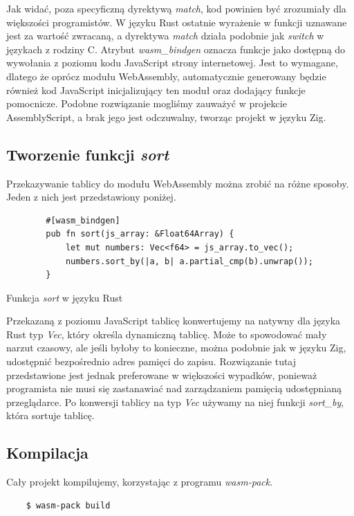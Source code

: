 \documentclass[language=polish,type=master]{aghmodern}
\begin{document}
Jak widać, poza specyficzną dyrektywą \emph{match}, kod powinien być zrozumiały dla większości programistów.
W języku Rust ostatnie wyrażenie w funkcji uznawane jest za wartość zwracaną, a dyrektywa \emph{match} działa podobnie jak \emph{switch} w językach z rodziny C.
Atrybut \emph{wasm\_bindgen} oznacza funkcje jako dostępną do wywołania z poziomu kodu JavaScript strony internetowej.
Jest to wymagane, dlatego że oprócz modułu WebAssembly, automatycznie generowany będzie również kod JavaScript inicjalizujący ten moduł oraz dodający funkcje pomocnicze.
Podobne rozwiązanie mogliśmy zauważyć w projekcie AssemblyScript, a brak jego jest odczuwalny, tworząc projekt w języku Zig.

\clearpage

\subsection{Tworzenie funkcji \emph{sort}}
Przekazywanie tablicy do modułu WebAssembly można zrobić na różne sposoby.
Jeden z nich jest przedstawiony poniżej.

\begin{listing}[H]
    \begin{verbatim}
        #[wasm_bindgen]
        pub fn sort(js_array: &Float64Array) {
            let mut numbers: Vec<f64> = js_array.to_vec();
            numbers.sort_by(|a, b| a.partial_cmp(b).unwrap());
        }
    \end{verbatim}
    \caption{Funkcja \emph{sort} w języku Rust}
\end{listing}

Przekazaną z poziomu JavaScript tablicę konwertujemy na natywny dla języka Rust typ \emph{Vec}, który określa dynamiczną tablicę.
Może to spowodować mały narzut czasowy, ale jeśli byłoby to konieczne, można podobnie jak w języku Zig, udostępnić bezpośrednio adres pamięci do zapisu.
Rozwiązanie tutaj przedstawione jest jednak preferowane w większości wypadków, ponieważ programista nie musi się zastanawiać nad zarządzaniem pamięcią udostępnianą przeglądarce.
Po konwersji tablicy na typ \emph{Vec} używamy na niej funkcji \emph{sort\_by}, która sortuje tablicę.

\subsection{Kompilacja}
Cały projekt kompilujemy, korzystając z programu \emph{wasm-pack}.

\begin{verbatim}
    $ wasm-pack build
\end{verbatim}
\end{document}
